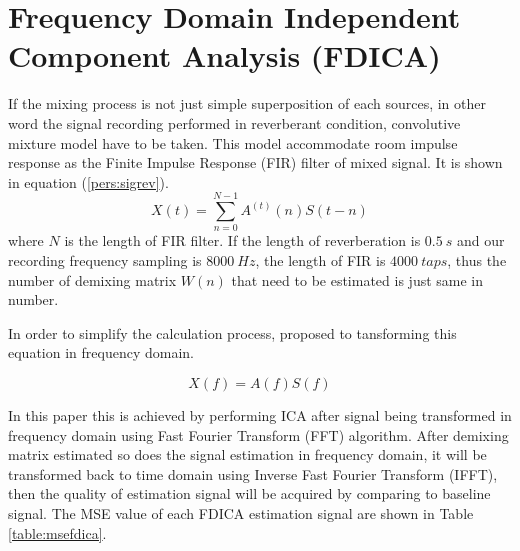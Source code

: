 \documentclass[a4paper]{jpconf}
\begin{document}
\section{Frequency Domain Independent Component Analysis (FDICA)}
If the mixing process is not just simple superposition of each sources, in other word the signal recording performed in reverberant condition, convolutive mixture model have to be taken. This model accommodate room impulse response as the Finite Impulse Response (FIR) filter of mixed signal. It is shown in equation (\ref{pers:sigrev}).
\begin{equation}\label{pers:sigrev}
X(t) = \sum_{n=0}^{N-1}A^{(t)}(n)S(t-n)
\end{equation}
where $N$ is the length of FIR filter. If the length of reverberation is $0.5~s$ and our recording frequency sampling is $8000~Hz$, the length of FIR is $4000~taps$, thus the number of demixing matrix $W(n)$ that need to be estimated is just same in number.

In order to simplify the calculation process, \cite{6} proposed to tansforming this equation in frequency domain.

\begin{equation}
X(f)=A(f)S(f)
\end{equation}

In this paper this is achieved by performing ICA after signal being transformed in frequency domain using Fast Fourier Transform (FFT) algorithm. After demixing matrix estimated so does the signal estimation in frequency domain, it will be transformed back to time domain using Inverse Fast Fourier Transform (IFFT), then the quality of estimation signal will be acquired by comparing to baseline signal. The MSE value of each FDICA estimation signal are shown in Table \ref{table:msefdica}.
\end{document}
